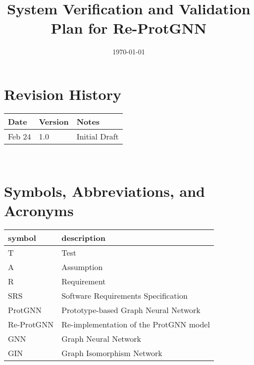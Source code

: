 \documentclass[12pt, titlepage]{article}
\begin{document}
\title{System Verification and Validation Plan for Re-ProtGNN} 
\author{\authname}
\date{\today}
	
\maketitle


\section*{Revision History}

\begin{tabularx}{\textwidth}{p{3cm}p{2cm}X}
\toprule {\bf Date} & {\bf Version} & {\bf Notes}\\
\midrule
Feb 24 & 1.0 & Initial Draft\\
\bottomrule
\end{tabularx}

~\\


\newpage

\tableofcontents

\listoftables


\newpage

\section{Symbols, Abbreviations, and Acronyms}

\renewcommand{\arraystretch}{1.2}
\begin{tabular}{l l} 
  \toprule		
  \textbf{symbol} & \textbf{description}\\
  \midrule 
  T & Test\\
  A & Assumption\\
  R & Requirement\\
  SRS & Software Requirements Specification\\
  ProtGNN & Prototype-based Graph Neural Network\\
  Re-ProtGNN & Re-implementation of the ProtGNN model\\
  GNN & Graph Neural Network\\
  GIN & Graph Isomorphism Network\\
  \bottomrule
\end{tabular}\\

\newpage
\end{document}
